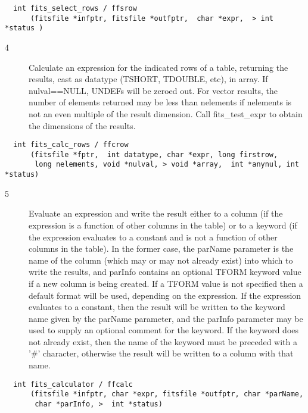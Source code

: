 \documentclass[11pt]{book}
\begin{document}
\begin{verbatim}
  int fits_select_rows / ffsrow
      (fitsfile *infptr, fitsfile *outfptr,  char *expr,  > int *status )
\end{verbatim}

\begin{description}
\item[4 ] Calculate an expression for the indicated rows of a table, returning
the results, cast as datatype (TSHORT, TDOUBLE, etc), in array.  If
nulval==NULL, UNDEFs will be zeroed out.  For vector results, the number
of elements returned may be less than nelements if nelements is not an
even multiple of the result dimension.  Call fits\_test\_expr to obtain
the dimensions of the results.  \label{ffcrow}
\end{description}

\begin{verbatim}
  int fits_calc_rows / ffcrow
      (fitsfile *fptr,  int datatype, char *expr, long firstrow,
       long nelements, void *nulval, > void *array,  int *anynul, int *status)
\end{verbatim}

\begin{description}
\item[5 ]Evaluate an expression and write the result either to a column (if
the expression is a function of other columns in the table) or to a
keyword (if the expression evaluates to a constant and is not a
function of other columns in the table).  In the former case, the
parName parameter is the name of the column (which may or may not already
exist) into which to write the results, and parInfo contains an
optional TFORM keyword value if a new column is being created.  If a
TFORM value is not specified then a default format will be used,
depending on the expression.  If the expression evaluates to a constant,
then the result will be written to the keyword name given by the
parName parameter, and the parInfo parameter may be used to supply an
optional comment for the keyword.  If the keyword does not already
exist, then the name of the keyword must be preceded with a '\#' character,
 otherwise the result will be written to a column with that name. \label{ffcalc}
\end{description}

\begin{verbatim}
  int fits_calculator / ffcalc
      (fitsfile *infptr, char *expr, fitsfile *outfptr, char *parName,
       char *parInfo, >  int *status)
\end{verbatim}
\end{document}
